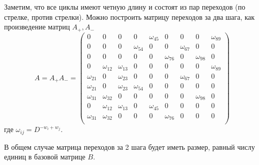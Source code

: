 Заметим, что все циклы имеют четную длину и состоят из пар переходов
(по стрелке, против стрелки). Можно построить матрицу переходов за
два шага, как произведение матриц $A_+, A_-$
\[
A=A_+A_{-}=\begin{pmatrix}
     0    & 0 &    0 &    0 &    \omega_{45}   &  0 &    0 &    0 &    \omega_{89}\\
     0&     0&     0&     \omega_{54} &    0  &   0  &   \omega_{67}  &   0  &   0 \\
     0&     0&     0&     0&     0&     \omega_{76} &     0&      \omega_{98}   &   0\\
     0&     \omega_{12}      & \omega_{13}  &    0 &    0  &   0 &    0  &   0      & \omega_{89} \\
\omega_{21}     &0     & \omega_{23}     &0   &0   &0     & \omega_{67}     &0 &   0\\
\omega_{21}     &0     & \omega_{23}      & \omega_{54}    &0   &0   &0   &0   & 0\\
\omega_{31}     & \omega_{32}  &0    &0   &0   &0   &0     & \omega_{98}     & 0\\
    0     & \omega_{12}      & \omega_{13}     &0    & \omega_{45}     &0   &0   &0   & 0\\
\omega_{31}      & \omega_{32}     &0   &0   &0     & \omega_{76}     &0   &0   & 0\\
\end{pmatrix}
\]
где
$\omega_{ij}=D^{-w_i+w_j}$.
%

В общем случае матрица переходов за 2 шага будет иметь размер, равный числу единиц в 
базовой матрице $B$. 

